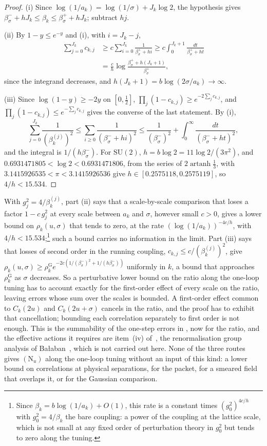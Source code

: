 \documentclass[aps,prd,twocolumn,superscriptaddress,nofootinbib,longbibliography,floatfix,amsmath,amssymb,10pt]{revtex4-2}
\theoremstyle{definition}
\theoremstyle{remark}
\newcommand{\SU}{\mathrm{SU}}
\begin{document}
\begin{proof}
(i) Since $\log(1/a_k)=\log(1/\sigma)+J_k\log2$, the hypothesis gives
$\beta^-_\sigma+hJ_k\le\beta_k\le\beta^+_\sigma+hJ_k$; subtract $hj$.

(ii) By $1-y\le e^{-y}$ and (i), with $i=J_k-j$,
\[
\begin{split}
\sum_{j=0}^{J_k}c_{k,j}&\ge c\sum_{i=0}^{J_k}\frac1{\beta^+_\sigma+hi}\ge
c\int_0^{J_k+1}\frac{dt}{\beta^+_\sigma+ht}\\
&=\frac ch\log\frac{\beta^+_\sigma+h(J_k+1)}{\beta^+_\sigma},
\end{split}
\]
since the integrand decreases, and $h(J_k+1)=b\log(2\sigma/a_k)\to\infty$.

(iii) Since $\log(1-y)\ge-2y$ on $[0,\frac12]$,
$\prod_j(1-c_{k,j})\ge e^{-2\sum_jc_{k,j}}$, and $\prod_j(1-c_{k,j})\le
e^{-\sum_jc_{k,j}}$ gives the converse of the last statement. By (i),
\[
\sum_{j=0}^{J_k}\frac1{(\beta^{(j)}_k)^2}\le\sum_{i\ge0}\frac1{(\beta^-_\sigma
+hi)^2}\le\frac1{(\beta^-_\sigma)^2}+\int_0^\infty\frac{dt}{(\beta^-_\sigma+
ht)^2},
\]
and the integral is $1/(h\beta^-_\sigma)$. For $\SU(2)$, $h=b\log2=11\log2/
(3\pi^2)$, and $0.6931471805<\log2<0.6931471806$, from the series of
$2\operatorname{artanh}\frac13$, with $3.1415926535<\pi<3.1415926536$ give
$h\in[0.2575118,0.2575119]$, so $4/h<15.534$.
\end{proof}

With $g_j^2=4/\beta^{(j)}_k$, part (ii) says that a scale-by-scale
comparison that loses a factor $1-c\,g_j^2$ at every scale between $a_k$ and
$\sigma$, however small $c>0$, gives a lower bound on $\rho_k(u,\sigma)$ that
tends to zero, at the rate $(\log(1/a_k))^{-4c/h}$, with $4/h<15.534$;\footnote{Since $\beta_k=b\log(1/a_k)+O(1)$, this rate is a constant times $(g_0^2)^{4c/h}$ with $g_0^2=4/\beta_k$ the bare coupling: a power of the coupling at the lattice scale, which is not small at any fixed order of perturbation theory in $g_0^2$ but tends to zero along the tuning.} such a
bound carries no information in the limit. Part (iii) says that losses of
second order in the running coupling, $c_{k,j}\le c/(\beta^{(j)}_k)^2$, give $\rho_k(u,\sigma)\ge
\rho^{\mathrm G}_ke^{-2c(1/(\beta^-_\sigma)^2+1/(h\beta^-_\sigma))}$ uniformly
in $k$, a bound that approaches $\rho^{\mathrm G}_k$ as $\sigma$ decreases.
So a perturbative lower bound on the ratio along the one-loop tuning has to
account exactly for the first-order effect of every scale on the ratio,
leaving errors whose sum over the scales is bounded. A first-order effect
common to $C_k(2u)$ and $C_k(2u+\sigma)$ cancels in the ratio, and the proof
has to exhibit that cancellation; bounding each correlation separately to
first order is not enough. This is the summability of the one-step errors in
\cite[Proposition~460]{BBLR26}, now for the ratio, and the effective
actions it requires are item~(iv) of~\cite[Sec.~XIII\,V]{BBLR26}, the
renormalisation group analysis of Ba{\l}aban~\cite{Bal84a,Bal85a,Bal89b},
which is not carried out here. None of the three routes gives
$(\mathrm N_u)$ along the one-loop tuning without an input of this kind:
a lower bound on correlations at physical separations, for the packet, for
a smeared field that overlaps it, or for the Gaussian comparison.
\end{document}
